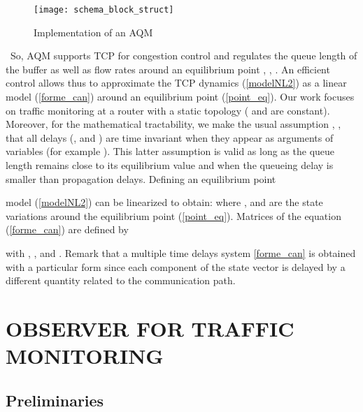 \documentclass[a4paper, 10pt, onecolumn]{article}
\begin{document}
\begin{figure}
       \centerline{\texttt{[image: schema\_block\_struct]}}
       \caption{Implementation of an AQM}
       \label{schema_block_struct}
\end{figure}

~\indent So, AQM supports TCP for congestion control and regulates the queue length of the buffer as well as flow rates around an equilibrium point \cite{Lab07b}, \cite{Kim06}, \cite{Hol02}. An efficient control allows thus to approximate the TCP dynamics (\ref{modelNL2}) as a linear model (\ref{forme_can}) around an equilibrium point (\ref{point_eq}). Our work focuses on traffic monitoring at a router with a static topology ( and  are constant). Moreover, for the mathematical tractability, we make the usual assumption \cite{Low02}, \cite{Hol02}, \cite{Kim06} that all delays (,  and ) are time invariant when they appear as arguments of variables (for example ). This latter assumption is valid as long as the queue length remains close to its equilibrium value and when the queueing delay is smaller than propagation delays. Defining an equilibrium point

model (\ref{modelNL2}) can be linearized to obtain:
{\small
}
where ,  and  are the state variations around the equilibrium point (\ref{point_eq}). Matrices of the equation (\ref{forme_can}) are defined by

with , ,  and .
Remark that a multiple time delays system \eqref{forme_can} is obtained with a particular form since each component of the state vector is delayed by a different quantity related to the communication path. 


\section{OBSERVER FOR TRAFFIC MONITORING}

\subsection{Preliminaries}
\end{document}
